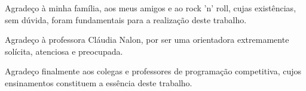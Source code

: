 \indent

Agradeço à minha família, aos meus amigos e ao rock 'n' roll, cujas existências, sem dúvida, foram fundamentais para a realização deste trabalho.

Agradeço à professora Cláudia Nalon, por ser uma orientadora extremamente solícita, atenciosa e preocupada.

Agradeço finalmente aos colegas e professores de programação competitiva, cujos ensinamentos constituem a essência deste trabalho.
